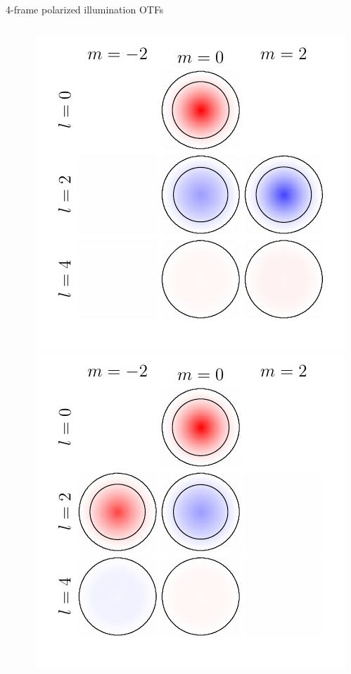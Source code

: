 \documentclass[presentation]{beamer}
\begin{document}
\begin{frame}[label=sec-1]{4-frame polarized illumination OTFs}
\begin{columns}
\begin{column}{0.25\textwidth}
    \end{column}
    \begin{column}{0.25\textwidth}
      \centering
      \includegraphics[width=1.0\columnwidth]{pol_illum/otf2.pdf}\\
      \includegraphics[width=1.0\columnwidth]{pol_illum/otf3.pdf}      
    \end{column}
  \end{columns}
\end{frame}
\end{document}
